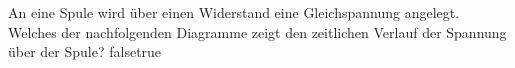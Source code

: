     {An eine Spule wird über einen Widerstand eine Gleichspannung angelegt. Welches der nachfolgenden Diagramme zeigt den zeitlichen Verlauf der Spannung über der Spule?}
    {}
    {}
    {}
    {}
    {false}{true}